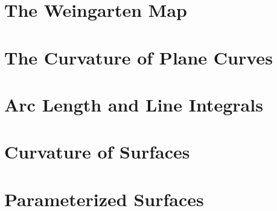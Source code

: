\section{The Weingarten Map}

\section{The Curvature of Plane Curves}

\section{Arc Length and Line Integrals}

\section{Curvature of Surfaces}

\setcounter{section}{13}
\section{Parameterized Surfaces}


